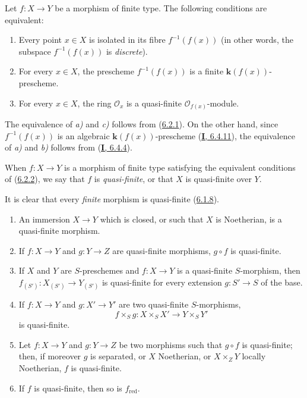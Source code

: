 \begin{corollary}[6.2.2]
\label{II.6.2.2}
Let $f:X\to Y$ be a morphism of finite type. The following conditions are
equivalent:
\begin{enumerate}
\item[\textup{a)}] Every point $x\in X$ is isolated in its fibre $f^{-1}(f(x))$
\textup{(in other words, the subspace $f^{-1}(f(x))$ is \emph{discrete})}.
\item[\textup{b)}] For every $x\in X$, the prescheme $f^{-1}(f(x))$ is a finite
$\boldsymbol{k}(f(x))$-prescheme.
\item[\textup{c)}] For every $x\in X$, the ring $\mathcal{O}_x$ is a quasi-finite
$\mathcal{O}_{f(x)}$-module.
\end{enumerate}
\end{corollary}

The equivalence of \emph{a)} and \emph{c)} follows from
(\hyperref[II.6.2.1]{6.2.1}). On the other hand, since $f^{-1}(f(x))$ is
an algebraic $\boldsymbol{k}(f(x))$-prescheme (\hyperref[I.6.4.11]{\textbf{I}, 6.4.11}), the
equivalence of \emph{a)} and \emph{b)} follows from (\hyperref[I.6.4.4]{\textbf{I}, 6.4.4}).

\begin{definition}[6.2.3]
\label{II.6.2.3}
When $f:X\to Y$ is a morphism of finite type satisfying the equivalent
conditions of (\hyperref[II.6.2.2]{6.2.2}), we say that $f$ is
\emph{quasi-finite}, or that $X$ is quasi-finite over $Y$.
\end{definition}

It is clear that every \emph{finite} morphism is quasi-finite
(\hyperref[II.6.1.8]{6.1.8}).

\begin{proposition}[6.2.4]
\label{II.6.2.4}
\begin{enumerate}
\item[\textup{(i)}] An immersion $X\to Y$ which is closed, or such that $X$ is
Noetherian, is a quasi-finite morphism.
\item[\textup{(ii)}] If $f:X\to Y$ and $g:Y\to Z$ are quasi-finite morphisms,
$g\circ f$ is quasi-finite.
\item[\textup{(iii)}] If $X$ and $Y$ are $S$-preschemes and $f:X\to Y$ is a
quasi-finite $S$-morphism, then $f_{(S')}:X_{(S')}\to Y_{(S')}$ is
quasi-finite for every extension $g:S'\to S$ of the base.
\item[\textup{(iv)}] If $f:X\to Y$ and $g:X'\to Y'$ are two quasi-finite
$S$-morphisms,
\[
f\times_S g:X\times_S X'\to Y\times_S Y'
\]
is quasi-finite.
\item[\textup{(v)}] Let $f:X\to Y$ and $g:Y\to Z$ be two morphisms such that $g\circ
f$ is quasi-finite; then, if moreover $g$ is separated, or $X$ Noetherian, or
$X\times_ZY$ locally Noetherian, $f$ is quasi-finite.
\item[\textup{(vi)}] If $f$ is quasi-finite, then so is $f_{\mathrm{red}}$.
\end{enumerate}
\end{proposition}

